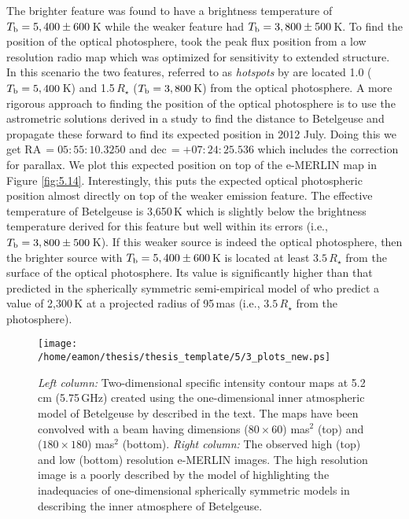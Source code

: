 The brighter feature was found to have a brightness temperature of $T_{\rm{b}}=5,400\pm 600$\,K while the weaker feature had $T_{\rm{b}}=3,800\pm 500$\,K. To find the position of the optical photosphere, \cite{richards_2013} took the peak flux position from a low resolution radio map which was optimized for sensitivity to extended structure. In this scenario the two features, referred to as \textit{hotspots} by \cite{richards_2013} are located 1.0 ($T_{\rm{b}}=5,400$\,K) and 1.5\,$R_{\star}$ ($T_{\rm{b}}=3,800$\,K) from the optical photosphere. A more rigorous approach to finding the position of the optical photosphere is to use the astrometric solutions derived in a study to find the distance to Betelgeuse \citep[solution 5 in][]{harper_2008} and propagate these forward to find its expected position in 2012 July. Doing this we get RA\,$=05:55:10.3250$ and dec\,$=+07:24:25.536$ which includes the correction for parallax. We plot this expected position on top of the e-MERLIN map in Figure \ref{fig:5.14}. Interestingly, this puts the expected optical photospheric position almost directly on top of the weaker emission feature. The effective temperature of Betelgeuse is 3,650\,K \citep{levesque_2005} which is slightly below the brightness temperature derived for this feature but well within its errors (i.e., $T_{\rm{b}}=3,800\pm 500$\,K). If this weaker source is indeed the optical photosphere, then the brighter source with $T_{\rm{b}}=5,400\pm 600$\,K is located at least $3.5\,R_{\star}$ from the surface of the optical photosphere. Its value is significantly higher than that predicted in the spherically symmetric semi-empirical model of \cite{harper_2001} who predict a value of 2,300\,K at a projected radius of 95\,mas (i.e., $3.5\,R_{\star}$ from the photosphere).

\begin{figure}[!ht]
\centering 
          \texttt{[image: /home/eamon/thesis/thesis\_template/5/3\_plots\_new.ps]}
\caption[]{\textit{Left column:} Two-dimensional specific intensity contour maps at 5.2\,cm (5.75\,GHz) created using the one-dimensional inner atmospheric model of Betelgeuse by \cite{harper_2001} described in the text. The maps have been convolved with a beam having dimensions ($80\times 60$) mas$^2$ (top) and ($180\times 180$) mas$^2$ (bottom). \textit{Right column:} The observed high (top) and low (bottom) resolution e-MERLIN images. The high resolution image is a poorly described by the model of \cite{harper_2001} highlighting the inadequacies of one-dimensional spherically symmetric models in describing the inner atmosphere of Betelgeuse.}
\label{fig:5.15}
\end{figure}

